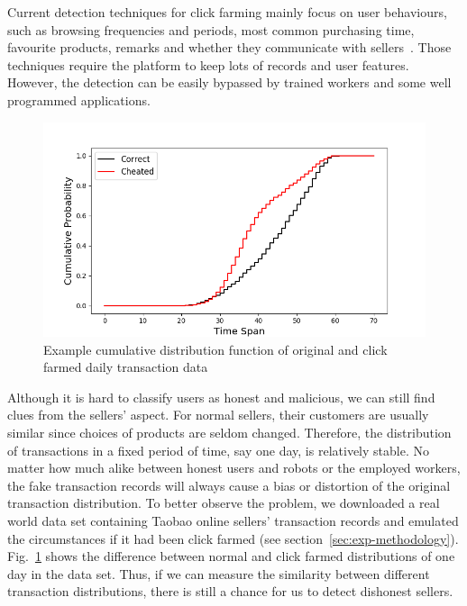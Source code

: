 \documentclass[10pt,conference,letterpaper]{IEEEtran}
\begin{document}
			Current detection techniques for click farming mainly focus on user behaviours, such as browsing frequencies and periods, most common purchasing time, favourite products, remarks and whether they communicate with sellers~\cite{simpleDetection}. Those techniques require the platform to keep lots of records and user features. However, the detection can be easily bypassed by trained workers and some well programmed applications.

			\begin{figure}[t]
				\centering
				\includegraphics[width=\linewidth]{fig/ExampleCDF.png}
				\caption{Example cumulative distribution function of original and click farmed daily transaction data}
				\label{fig:example-ecdf}
			\end{figure}

			Although it is hard to classify users as honest and malicious, we can still find clues from the sellers' aspect. For normal sellers, their customers are usually similar since choices of products are seldom changed. Therefore, the distribution of transactions in a fixed period of time, say one day, is relatively stable. No matter how much alike between honest users and robots or the employed workers, the fake transaction records will always cause a bias or distortion of the original transaction distribution. To better observe the problem, we downloaded a real world data set containing Taobao online sellers' transaction records and emulated the circumstances if it had been click farmed (see section~\ref{sec:exp-methodology}). Fig.~\ref{fig:example-ecdf} shows the difference between normal and click farmed distributions of one day in the data set.
			Thus, if we can measure the similarity between different transaction distributions, there is still a chance for us to detect dishonest sellers.
	
\end{document}
